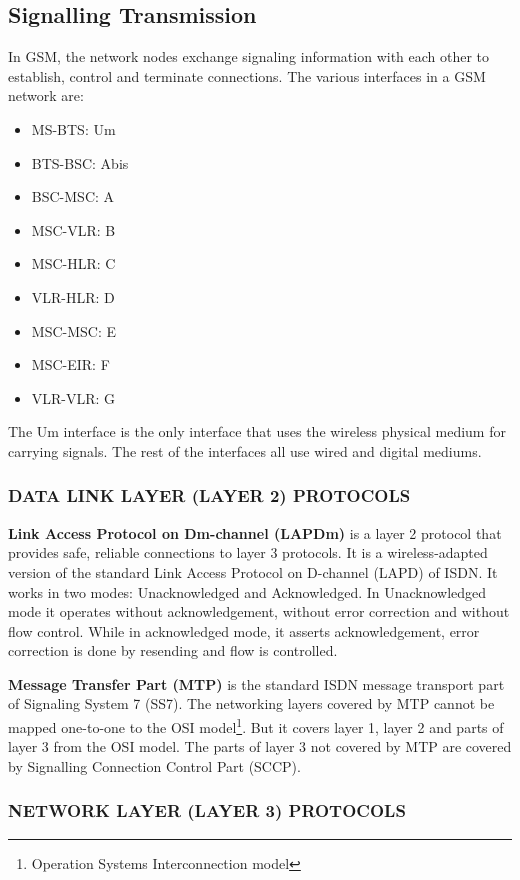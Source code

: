 \subsection{Signalling Transmission}
In GSM, the network nodes exchange signaling information with each other to establish, control and terminate connections.
The various interfaces in a GSM network are:
\begin{itemize}[noitemsep,topsep=0pt,parsep=0pt,partopsep=0pt]
 \item MS-BTS: Um
 \item BTS-BSC: Abis
 \item BSC-MSC: A
 \item MSC-VLR: B
 \item MSC-HLR: C
 \item VLR-HLR: D
 \item MSC-MSC: E
 \item MSC-EIR: F
 \item VLR-VLR: G
\end{itemize}

The Um interface is the only interface that uses the wireless physical medium for carrying signals. The rest of the interfaces all use wired and digital mediums.

\subsubsection{\uppercase{Data Link Layer (Layer 2) protocols}}

\textbf{Link Access Protocol on Dm-channel (LAPDm)} is a layer 2 protocol that provides safe, reliable connections to layer 3 protocols. It is a wireless-adapted version of 
 the standard Link Access Protocol on D-channel (LAPD) of ISDN. It works in two modes: Unacknowledged and Acknowledged. In Unacknowledged mode it operates without acknowledgement,
 without error correction and without flow control. While in acknowledged mode, it asserts acknowledgement, error correction is done by resending and flow is controlled.
 
 
 \textbf{Message Transfer Part (MTP)} is the standard ISDN message transport part of Signaling System 7 (SS7). The networking layers covered by MTP cannot be mapped
 one-to-one to the OSI model\footnote{Operation Systems Interconnection model}. But it covers layer 1, layer 2 and parts of layer 3 from the OSI model. The parts of layer 3
 not covered by MTP are covered by Signalling Connection Control Part (SCCP).

\subsubsection{\uppercase{Network Layer (Layer 3) protocols}}

